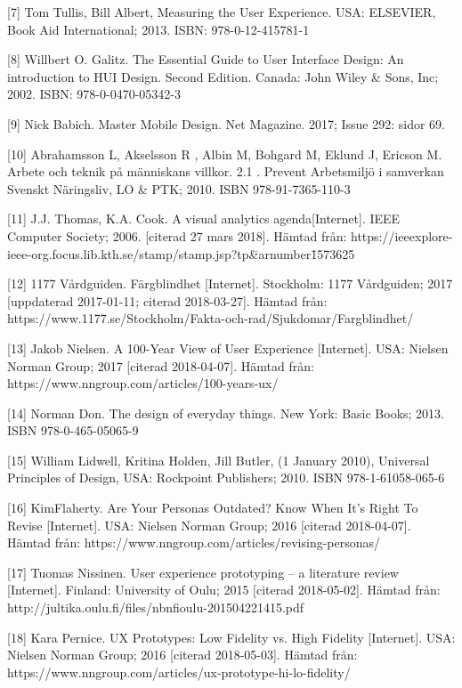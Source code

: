\documentclass[12pt]{kththesis}
\begin{document}
[7] Tom Tullis, Bill Albert, Measuring the User Experience. USA: ELSEVIER, Book Aid International; 2013. ISBN: 978-0-12-415781-1

[8] Willbert O. Galitz. The Essential Guide to User Interface Design: An introduction to HUI Design. Second Edition. Canada: John Wiley \& Sons, Inc; 2002. ISBN: 978-0-0470-05342-3

[9] Nick Babich. Master Mobile Design. Net Magazine. 2017; Issue 292: sidor 69.         

[10] Abrahamsson L, Akselsson R , Albin M,  Bohgard M, Eklund J, Ericson M. Arbete och teknik på människans villkor. 2.1 . Prevent Arbetsmiljö i samverkan Svenskt Näringsliv, LO \& PTK; 2010. ISBN 978-91-7365-110-3

[11] J.J. Thomas, K.A. Cook. A visual analytics agenda[Internet]. IEEE Computer Society; 2006. [citerad 27 mars 2018]. Hämtad från: \newline
https://ieeexplore-ieee-org.focus.lib.kth.se\newline/stamp/stamp.jsp?tp\=\&arnumber\=1573625

[12] 1177 Vårdguiden. Färgblindhet [Internet]. Stockholm: 1177 Vårdguiden; 2017 [uppdaterad 2017-01-11; citerad 2018-03-27]. Hämtad från:\newline 
https://www.1177.se/Stockholm/Fakta-och-rad/Sjukdomar/Fargblindhet/

[13] Jakob Nielsen. A 100-Year View of User Experience [Internet].  USA: Nielsen Norman Group; 2017 [citerad 2018-04-07]. Hämtad från:  \newline https://www.nngroup.com/articles/100-years-ux/

[14] Norman Don. The design of everyday things. New York: Basic Books; 2013. ISBN 978-0-465-05065-9 

[15] William Lidwell, Kritina Holden, Jill Butler, (1 January 2010), Universal Principles of Design, USA: Rockpoint Publishers; 2010. ISBN 978-1-61058-065-6

[16] KimFlaherty. Are Your Personas Outdated? Know When It’s Right To Revise [Internet]. USA: Nielsen Norman Group; 2016 [citerad 2018-04-07]. Hämtad från:  https://www.nngroup.com/articles/revising-personas/ 

[17] Tuomas Nissinen. User experience prototyping – a literature review [Internet]. Finland: University of Oulu; 2015 [citerad 2018-05-02]. Hämtad från: http://jultika.oulu.fi/files/nbnfioulu-201504221415.pdf 

[18] Kara Pernice. UX Prototypes: Low Fidelity vs. High Fidelity [Internet].  USA: Nielsen Norman Group; 2016 [citerad 2018-05-03]. Hämtad från: https://www.nngroup.com/articles/ux-prototype-hi-lo-fidelity/ 
\end{document}
